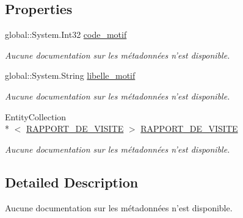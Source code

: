 \subsection*{Properties}
\begin{DoxyCompactItemize}
\item 
global\-::\-System.\-Int32 \hyperlink{class_model_1_1_m_o_t_i_f_a72c3259738d73e8c4ab96d046c7fd5a9}{code\-\_\-motif}
\begin{DoxyCompactList}\small\item\em Aucune documentation sur les métadonnées n'est disponible. \end{DoxyCompactList}\item 
global\-::\-System.\-String \hyperlink{class_model_1_1_m_o_t_i_f_a72046bb40be3fd2da573e935fb49a81b}{libelle\-\_\-motif}
\begin{DoxyCompactList}\small\item\em Aucune documentation sur les métadonnées n'est disponible. \end{DoxyCompactList}\item 
Entity\-Collection\\*
$<$ \hyperlink{class_model_1_1_r_a_p_p_o_r_t___d_e___v_i_s_i_t_e}{R\-A\-P\-P\-O\-R\-T\-\_\-\-D\-E\-\_\-\-V\-I\-S\-I\-T\-E} $>$ \hyperlink{class_model_1_1_m_o_t_i_f_a274a1b2205178e4d10d4facee7b4653b}{R\-A\-P\-P\-O\-R\-T\-\_\-\-D\-E\-\_\-\-V\-I\-S\-I\-T\-E}
\begin{DoxyCompactList}\small\item\em Aucune documentation sur les métadonnées n'est disponible. \end{DoxyCompactList}\end{DoxyCompactItemize}


\subsection{Detailed Description}
Aucune documentation sur les métadonnées n'est disponible. 



